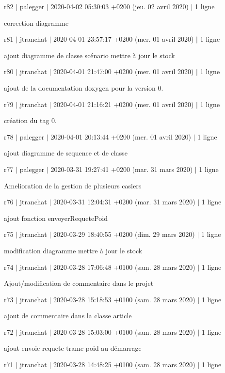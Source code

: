 r82 $\vert$ palegger $\vert$ 2020-\/04-\/02 05\+:30\+:03 +0200 (jeu. 02 avril 2020) $\vert$ 1 ligne

correction diagramme

r81 $\vert$ jtranchat $\vert$ 2020-\/04-\/01 23\+:57\+:17 +0200 (mer. 01 avril 2020) $\vert$ 1 ligne

ajout diagramme de classe scénario mettre à jour le stock

r80 $\vert$ jtranchat $\vert$ 2020-\/04-\/01 21\+:47\+:00 +0200 (mer. 01 avril 2020) $\vert$ 1 ligne

ajout de la documentation doxygen pour la version 0.

r79 $\vert$ jtranchat $\vert$ 2020-\/04-\/01 21\+:16\+:21 +0200 (mer. 01 avril 2020) $\vert$ 1 ligne

création du tag 0.

r78 $\vert$ palegger $\vert$ 2020-\/04-\/01 20\+:13\+:44 +0200 (mer. 01 avril 2020) $\vert$ 1 ligne

ajout diagramme de sequence et de classe

r77 $\vert$ palegger $\vert$ 2020-\/03-\/31 19\+:27\+:41 +0200 (mar. 31 mars 2020) $\vert$ 1 ligne

Amelioration de la gestion de plusieurs casiers

r76 $\vert$ jtranchat $\vert$ 2020-\/03-\/31 12\+:04\+:31 +0200 (mar. 31 mars 2020) $\vert$ 1 ligne

ajout fonction envoyer\+Requete\+Poid

r75 $\vert$ jtranchat $\vert$ 2020-\/03-\/29 18\+:40\+:55 +0200 (dim. 29 mars 2020) $\vert$ 1 ligne

modification diagramme mettre à jour le stock

r74 $\vert$ jtranchat $\vert$ 2020-\/03-\/28 17\+:06\+:48 +0100 (sam. 28 mars 2020) $\vert$ 1 ligne

Ajout/modification de commentaire dans le projet

r73 $\vert$ jtranchat $\vert$ 2020-\/03-\/28 15\+:18\+:53 +0100 (sam. 28 mars 2020) $\vert$ 1 ligne

ajout de commentaire dans la classe article

r72 $\vert$ jtranchat $\vert$ 2020-\/03-\/28 15\+:03\+:00 +0100 (sam. 28 mars 2020) $\vert$ 1 ligne

ajout envoie requete trame poid au démarrage

r71 $\vert$ jtranchat $\vert$ 2020-\/03-\/28 14\+:48\+:25 +0100 (sam. 28 mars 2020) $\vert$ 1 ligne


